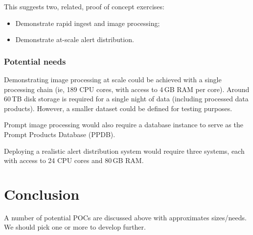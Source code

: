 This suggests two, related, proof of concept exercises:

\begin{itemize}

\item{Demonstrate rapid ingest and image processing;}
\item{Demonstrate at-scale alert distribution.}

\end{itemize}

\subsubsection{Potential needs}

Demonstrating image processing at scale could be achieved with a single processing chain (ie, 189 CPU cores, with access to 4\,GB RAM per core).
Around 60\,TB disk storage is required for a single night of data (including processed data products).
However, a smaller dataset could be defined for testing purposes.

Prompt image processing would also require a database instance to serve as the Prompt Products Database (PPDB).

Deploying a realistic alert distribution system would require three systems, each with access to 24 CPU cores and 80\,GB RAM.

\section{Conclusion}
A number of potential POCs are discussed above with approximates sizes/needs. We should pick one or more to develop further.
